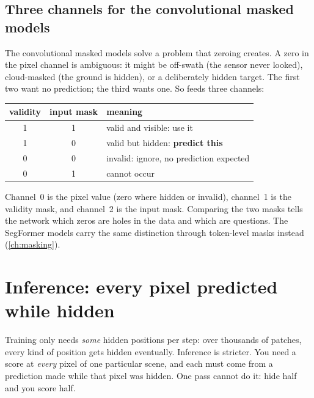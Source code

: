 \subsection{Three channels for the convolutional masked models}

The convolutional masked models solve a problem that zeroing creates. A zero in the pixel channel is
ambiguous: it might be off-swath (the sensor never looked), cloud-masked (the ground is hidden), or a
deliberately hidden target. The first two want no prediction; the third wants one. So
 feeds three channels:
\begin{center}
\begin{tabular}{ccl}
\toprule
validity & input mask & meaning\\
\midrule
1 & 1 & valid and visible: use it\\
1 & 0 & valid but hidden: \textbf{predict this}\\
0 & 0 & invalid: ignore, no prediction expected\\
0 & 1 & cannot occur\\
\bottomrule
\end{tabular}
\end{center}
Channel~0 is the pixel value (zero where hidden or invalid), channel~1 is the validity mask, and
channel~2 is the input mask. Comparing the two masks tells the network which zeros are holes in the data
and which are questions. The SegFormer models carry the same distinction through token-level masks
instead (\cref{ch:masking}).

\section{Inference: every pixel predicted while hidden}\label{sec:recon:inference}

Training only needs \emph{some} hidden positions per step: over thousands of patches, every kind of
position gets hidden eventually. Inference is stricter. You need a score at \emph{every} pixel of one
particular scene, and each must come from a prediction made while that pixel was hidden. One pass
cannot do it: hide half and you score half.

